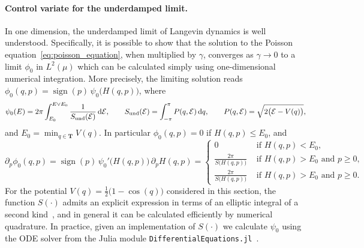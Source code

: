 \documentclass[11pt,a4paper]{article}
\DeclareMathOperator{\sign}{sign}
\newcommand{\torus}{\mathbf T}
\renewcommand{\d}{\mathrm d}
\theoremstyle{plain}
\numberwithin{equation}{section}
\renewcommand{\leq}{\leqslant}
\renewcommand{\geq}{\geqslant}
\begin{document}
\paragraph{Control variate for the underdamped limit.}%
\label{par:control_variate_for_the_underdamped_limit}
In one dimension,
the underdamped limit of Langevin dynamics is well understood.
Specifically, it is possible to show that the solution to the Poisson equation~\eqref{eq:poisson_equation},
when multiplied by $\gamma$,
converges as $\gamma \to 0$ to a limit $\phi_0$ in $L^2(\mu)$ which can be calculated simply using one-dimensional numerical integration.
More precisely,
the limiting solution reads $\phi_0(q,p) = \sign(p) \, \psi_0\bigl(H(q,p)\bigr)$,
where
\[
    \psi_0(E) = 2 \pi \int_{E_0}^{E \vee E_0} \frac{1}{S_{\rm und}(\mathcal E)} \, \d \mathcal E,
    \qquad S_{\rm und}(\mathcal E) = \int_{-\pi}^{\pi} P(q, \mathcal E) \, \d q, \qquad P(q, \mathcal E) = \sqrt {2 \bigl(\mathcal E - V(q)\bigr)},
\]
and $E_0 = \min_{q \in \torus} V(q)$.
In particular $\phi_0(q,p) = 0$ if $H(q,p) \leq E_0$,
and
\[
    \partial_p \phi_0(q, p)
    = \sign(p) \, \psi_0'\bigl(H(q,p)\bigr) \, \partial_p H(q,p)
    =
    \begin{cases}
        0 & \text{ if $H(q,p) < E_0$}, \\
        \frac{2 \pi}{S\bigl(H(q,p)\bigr)} & \text{ if $H(q,p) > E_0$ and $p \geq 0$}, \\
        \frac{2 \pi}{S\bigl(H(q,p)\bigr)} & \text{ if $H(q,p) > E_0$ and $p \geq 0$}.
    \end{cases}
\]
For the potential $V(q) = \frac{1}{2} \bigl(1 - \cos(q)\bigr)$ considered in this section,
the function $S(\cdot)$ admits an explicit expression in terms of an elliptic integral of a second kind~\cite{MR2427108},
and in general it can be calculated efficiently by numerical quadrature.
In practice, given an implementation of $S(\cdot)$ we calculate $\psi_0$ using the ODE solver from the Julia module \texttt{DifferentialEquations.jl}~\cite{rackauckas2017differentialequations}.
\end{document}
